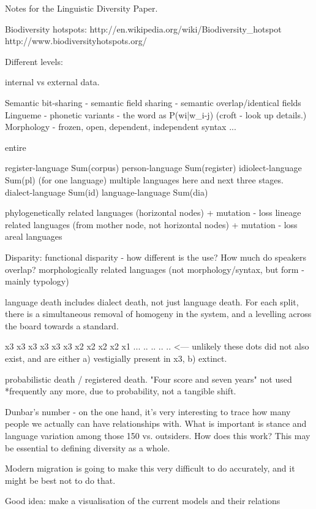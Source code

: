 Notes for the Linguistic Diversity Paper. 

Biodiversity hotspots:
http://en.wikipedia.org/wiki/Biodiversity_hotspot
http://www.biodiversityhotspots.org/

Different levels:

internal vs external data. 

Semantic bit-sharing - semantic field sharing - semantic overlap/identical fields
Lingueme - phonetic variants - the word as P(wi|w_i-j) (croft - look up details.)
Morphology - frozen, open, dependent, independent
syntax ...

entire 

register-language Sum(corpus)
person-language Sum(register)
idiolect-language Sum(pl) (for one language) multiple languages here and next three stages. 
dialect-language Sum(id)
language-language Sum(dia)

phylogenetically related languages (horizontal nodes) + mutation - loss
lineage related languages (from mother node, not horizontal nodes) + mutation - loss
areal languages

Disparity:
functional disparity - how different is the use? How much do speakers overlap?
morphologically related languages (not morphology/syntax, but form - mainly typology)

language death includes dialect death, not just language death. For each split, there is a simultaneous removal of homogeny in the system, and a levelling across the board towards a standard. 

x3 x3 x3 x3 x3 x3
x2 x2 x2 x2 
x1 ... .. .. .. .. <--- unlikely these dots did not also exist, and are either a) vestigially present in x3, b) extinct. 

probabilistic death / registered death. "Four score and seven years" not used *frequently any more, due to probability, not a tangible shift. 


Dunbar's number - on the one hand, it's very interesting to trace how many people we actually can have relationships with. What is important is stance and language variation among those 150 vs. outsiders. How does this work? This may be essential to defining diversity as a whole. 

Modern migration is going to make this very difficult to do accurately, and it might be best not to do that. 

Good idea: make a visualisation of the current models and their relations
